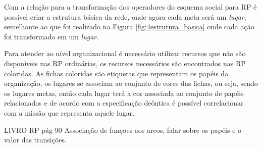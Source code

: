 Com a relação para a transformação dos operadores do esquema social para RP é possível criar a estrutura básica da rede, onde agora cada meta será um \textit{lugar}, semelhante ao que foi realizado na Figura \ref{fig:4estrutura_basica} onde cada ação foi transformado em um \textit{lugar}.  

Para atender ao nível organizacional é necessário utilizar recursos que não são disponíveis nas RP ordinárias, os recursos necessários são encontrados nas RP coloridas. As fichas coloridas são etiquetas que representam os papéis da organização, os lugares se associam ao conjunto de cores das fichas, ou seja, sendo os lugares metas, então cada lugar terá a cor associada ao conjunto de papéis relacionados e de acordo com a especificação deôntica é possível correlacionar com a missão que representa aquele lugar.

LIVRO RP pág 90 Associação de funçoes aos arcos, falar sobre os papéis e o valor das transições.

